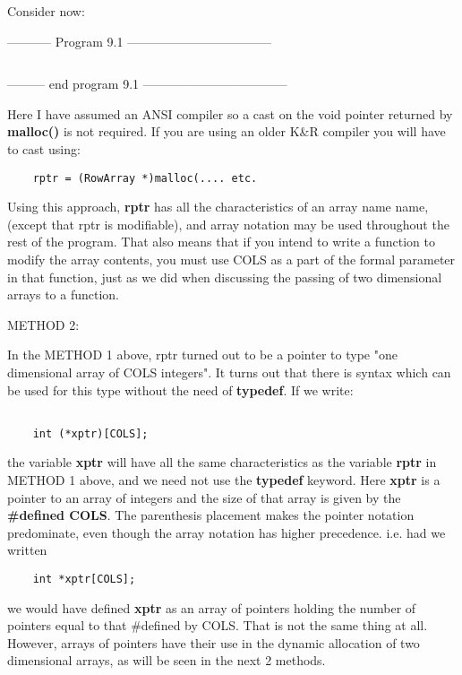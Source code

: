 Consider now:

-----------  Program 9.1  -----------------------------------
\inputminted{c}{../src/ch9-1.c}
--------- end program 9.1 -----------------------------------

Here I have assumed an ANSI compiler so a cast on the void pointer
returned by \textbf{malloc()} is not required. If you are using an older
K\&R compiler you will have to cast using:

\begin{verbatim}
    rptr = (RowArray *)malloc(.... etc.
\end{verbatim}

Using this approach, \textbf{rptr} has all the characteristics of an
array name name, (except that rptr is modifiable), and array notation
may be used throughout the rest of the program. That also means that if
you intend to write a function to modify the array contents, you must
use COLS as a part of the formal parameter in that function, just as we
did when discussing the passing of two dimensional arrays to a function.

METHOD 2:

In the METHOD 1 above, rptr turned out to be a pointer to type "one
dimensional array of COLS integers". It turns out that there is syntax
which can be used for this type without the need of \textbf{typedef}. If
we write:

\begin{verbatim}

    int (*xptr)[COLS];
\end{verbatim}

the variable \textbf{xptr} will have all the same characteristics as the
variable \textbf{rptr} in METHOD 1 above, and we need not use the
\textbf{typedef} keyword. Here \textbf{xptr} is a pointer to an array of
integers and the size of that array is given by the \textbf{\#defined
COLS}. The parenthesis placement makes the pointer notation predominate,
even though the array notation has higher precedence. i.e. had we
written

\begin{verbatim}
    int *xptr[COLS];
\end{verbatim}

we would have defined \textbf{xptr} as an array of pointers holding the
number of pointers equal to that \#defined by COLS. That is not the same
thing at all. However, arrays of pointers have their use in the dynamic
allocation of two dimensional arrays, as will be seen in the next 2
methods.

